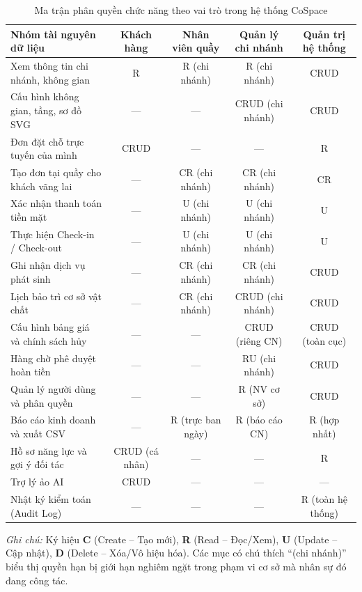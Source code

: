 \begin{table}[H]
\centering
\caption{Ma trận phân quyền chức năng theo vai trò trong hệ thống CoSpace}
\label{tab:matran_phanquyen}
\small
\renewcommand{\arraystretch}{1.2}
\begin{tabular}{|p{4.0cm}|c|c|c|c|}
\hline
\textbf{Nhóm tài nguyên dữ liệu} & \textbf{Khách hàng} & \textbf{Nhân viên quầy} & \textbf{Quản lý chi nhánh} & \textbf{Quản trị hệ thống} \\
\hline
Xem thông tin chi nhánh, không gian & R & R (chi nhánh) & R (chi nhánh) & CRUD \\
\hline
Cấu hình không gian, tầng, sơ đồ SVG & --- & --- & CRUD (chi nhánh) & CRUD \\
\hline
Đơn đặt chỗ trực tuyến của mình & CRUD & --- & --- & R \\
\hline
Tạo đơn tại quầy cho khách vãng lai & --- & CR (chi nhánh) & CR (chi nhánh) & CR \\
\hline
Xác nhận thanh toán tiền mặt & --- & U (chi nhánh) & U (chi nhánh) & U \\
\hline
Thực hiện Check-in / Check-out & --- & U (chi nhánh) & U (chi nhánh) & U \\
\hline
Ghi nhận dịch vụ phát sinh & --- & CR (chi nhánh) & CR (chi nhánh) & CRUD \\
\hline
Lịch bảo trì cơ sở vật chất & --- & CR (chi nhánh) & CRUD (chi nhánh) & CRUD \\
\hline
Cấu hình bảng giá và chính sách hủy & --- & --- & CRUD (riêng CN) & CRUD (toàn cục) \\
\hline
Hàng chờ phê duyệt hoàn tiền & --- & --- & RU (chi nhánh) & CRUD \\
\hline
Quản lý người dùng và phân quyền & --- & --- & R (NV cơ sở) & CRUD \\
\hline
Báo cáo kinh doanh và xuất CSV & --- & R (trực ban ngày) & R (báo cáo CN) & R (hợp nhất) \\
\hline
Hồ sơ năng lực và gợi ý đối tác & CRUD (cá nhân) & --- & --- & R \\
\hline
Trợ lý ảo AI & CRUD & --- & --- & --- \\
\hline
Nhật ký kiểm toán (Audit Log) & --- & --- & --- & R (toàn hệ thống) \\
\hline
\end{tabular}
\end{table}

\noindent\textit{Ghi chú:} Ký hiệu \textbf{C} (Create -- Tạo mới), \textbf{R} (Read -- Đọc/Xem), \textbf{U} (Update -- Cập nhật), \textbf{D} (Delete -- Xóa/Vô hiệu hóa). Các mục có chú thích ``(chi nhánh)'' biểu thị quyền hạn bị giới hạn nghiêm ngặt trong phạm vi cơ sở mà nhân sự đó đang công tác.
